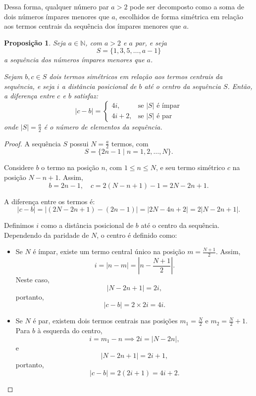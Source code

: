 \documentclass[a4paper,11pt]{article}
\newtheorem{proposition}[theorem]{Proposição}
\theoremstyle{definition}
\theoremstyle{remark}
\begin{document}
\begin{otherlanguage}{brazil}
	Dessa forma, qualquer número par $a > 2$ pode ser decomposto como a soma de dois números ímpares menores que $a$, escolhidos de forma simétrica em relação aos termos centrais da sequência dos ímpares menores que $a$.
		
	\vspace{1cm}
	
	\begin{proposition}\label{prop:distancia_simetrica}
		Seja $a \in \mathbb{N}$, com $a > 2$ e $a$ par, e seja
		\[
		S = \{1, 3, 5, \dotsc, a - 1\}
		\]
		a sequência dos números ímpares menores que $a$.
		
		Sejam $b, c \in S$ dois termos simétricos em relação aos termos centrais da sequência, e seja $i$ a distância posicional de $b$ até o centro da sequência $S$. Então, a diferença entre $c$ e $b$ satisfaz:
		\[
		|c - b| =
		\begin{cases}
			4i, & \text{se } |S| \text{ é ímpar} \\
			4i + 2, & \text{se } |S| \text{ é par}
		\end{cases}
		\]
		onde $|S| = \frac{a}{2}$ é o número de elementos da sequência.
	\end{proposition}
	
	\begin{proof}
		A sequência $S$ possui $N = \frac{a}{2}$ termos, com
		\[
		S = \{2n - 1 \mid n = 1, 2, \dotsc, N\}.
		\]
		
		Considere $b$ o termo na posição $n$, com $1 \leq n \leq N$, e seu termo simétrico $c$ na posição $N - n + 1$. Assim,
		\[
		b = 2n - 1, \quad c = 2(N - n + 1) - 1 = 2N - 2n + 1.
		\]
		
		A diferença entre os termos é:
		\[
		|c - b| = |(2N - 2n + 1) - (2n - 1)| = |2N - 4n + 2| = 2|N - 2n + 1|.
		\]
		
		Definimos $i$ como a distância posicional de $b$ até o centro da sequência. Dependendo da paridade de $N$, o centro é definido como:
		
		\begin{itemize}
			\item Se $N$ é ímpar, existe um termo central único na posição $m = \frac{N+1}{2}$. Assim,
			\[
			i = |n - m| = \left| n - \frac{N+1}{2} \right|.
			\]
			Neste caso,
			\[
			|N - 2n + 1| = 2i,
			\]
			portanto,
			\[
			|c - b| = 2 \times 2i = 4i.
			\]
			
			\item Se $N$ é par, existem dois termos centrais nas posições $m_1 = \frac{N}{2}$ e $m_2 = \frac{N}{2} + 1$. Para $b$ à esquerda do centro,
			\[
			i = m_1 - n \implies 2i = |N - 2n|,
			\]
			e
			\[
			|N - 2n + 1| = 2i + 1,
			\]
			portanto,
			\[
			|c - b| = 2(2i + 1) = 4i + 2.
			\]
		\end{itemize}
		

\end{proof}
\end{otherlanguage}
\end{document}
